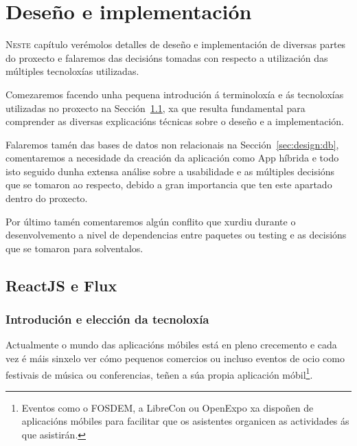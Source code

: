 \chapter{Deseño e implementación}
\label{cap:design}
\minitoc


  \lettrine{N}{este} capítulo verémolos detalles de deseño e implementación 
de diversas partes do proxecto e falaremos das decisións tomadas con 
respecto a utilización das múltiples tecnoloxías utilizadas.

  Comezaremos facendo unha pequena introdución á terminoloxía e ás tecnoloxías 
utilizadas no proxecto na Sección~\ref{sec:design:react}, xa que resulta 
fundamental para comprender as diversas explicacións técnicas sobre o deseño e 
a implementación.

  Falaremos tamén das bases de datos non relacionais na 
Sección~\ref{sec:design:db}, comentaremos a necesidade da creación da 
aplicación como App híbrida e todo isto seguido dunha extensa análise sobre a 
usabilidade e as múltiples decisións que se tomaron ao respecto, debido a gran 
importancia que ten este apartado dentro do proxecto.

  Por último tamén comentaremos algún conflito que xurdiu durante o 
desenvolvemento a nivel de dependencias entre paquetes ou testing e as 
decisións que se tomaron para solventalos.

  \section{ReactJS e Flux}
  \label{sec:design:react}
    \subsection{Introdución e elección da tecnoloxía}
    Actualmente o mundo das aplicacións móbiles está en pleno crecemento e cada 
vez é máis sinxelo ver cómo pequenos comercios ou incluso eventos de ocio 
como festivais de música ou conferencias, teñen a súa propia aplicación 
móbil\footnote{Eventos como o FOSDEM, a LibreCon ou OpenExpo xa dispoñen de 
aplicacións móbiles para facilitar que os asistentes organicen as actividades 
ás que asistirán.}.

